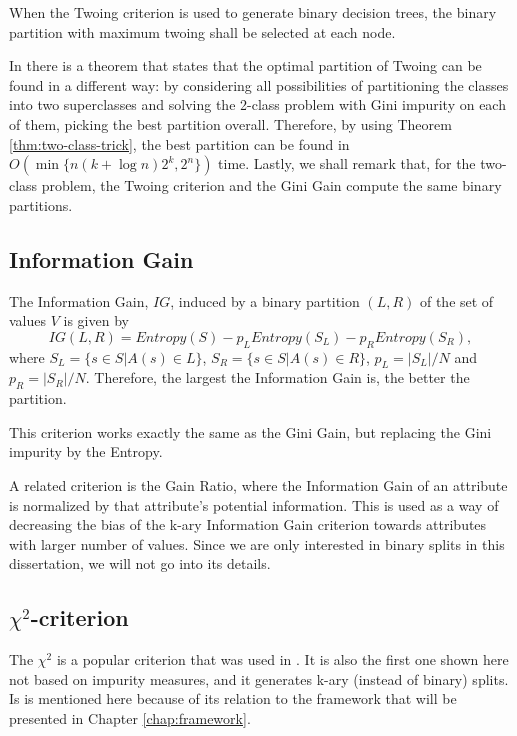 When the Twoing criterion is used to generate binary decision trees, the binary partition with maximum twoing shall be selected at each node. 

In \cite{Breiman84} there is a theorem that states that the optimal partition of Twoing can be found in a different way: by considering all possibilities of partitioning the classes into two superclasses and solving the 2-class problem with Gini impurity on each of them, picking the best partition overall. Therefore, by using Theorem \ref{thm:two-class-trick}, the best partition can be found in $O(\min \{ n (k + \log n) 2^k, 2^n \} )$ time. Lastly, we shall remark that, for the two-class problem, the Twoing criterion and the Gini Gain compute the same binary partitions.

\subsection{Information Gain}

The Information Gain, $IG$, induced by a binary partition $(L,R)$ 
of the set of values $V$ is given by 
\begin{equation}
 IG(L,R) = Entropy(S) -
p_L Entropy(S_L) - p_R Entropy(S_R),
\label{eq:InformationGain}
\end{equation}
where $S_L= \{ s \in S | A(s) \in L \}$, $S_R= \{ s \in S | A(s) \in R \}$,
 $p_L=|S_L| /N $ and $p_R=|S_R| /N$. Therefore, the largest the Information Gain is, the better the partition.

This criterion works exactly the same as the Gini Gain, but replacing the Gini impurity by the Entropy.

A related criterion is the Gain Ratio, where the Information Gain of an attribute is normalized by that attribute's potential information. This is used as a way of decreasing the bias of the k-ary Information Gain criterion towards attributes with larger number of values. Since we are only interested in binary splits in this dissertation, we will not go into its details.


\subsection{$\chi^2$-criterion}
The $\chi^2$ is a popular criterion that was  used in \cite{Mingers.87}. It is also the first one shown here not based on impurity measures, and it generates k-ary (instead of binary) splits. Is is mentioned here because of its relation to the framework that will be presented in Chapter \ref{chap:framework}.

